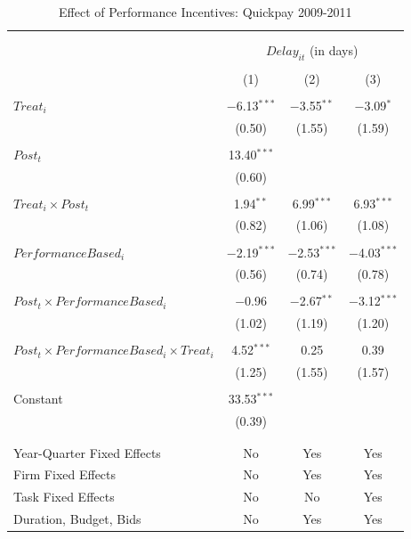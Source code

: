 \documentclass[
]{article}
\begin{document}
\begin{table}[H] \centering 
  \caption{Effect of Performance Incentives: Quickpay 2009-2011} 
  \label{} 
\small 
\begin{tabular}{@{\extracolsep{-2pt}}lccc} 
\\[-1.8ex]\hline 
\hline \\[-1.8ex] 
\\[-1.8ex] & \multicolumn{3}{c}{$Delay_{it}$ (in days)} \\ 
\\[-1.8ex] & (1) & (2) & (3)\\ 
\hline \\[-1.8ex] 
 $Treat_i$ & $-$6.13$^{***}$ & $-$3.55$^{**}$ & $-$3.09$^{*}$ \\ 
  & (0.50) & (1.55) & (1.59) \\ 
  & & & \\ 
 $Post_t$ & 13.40$^{***}$ &  &  \\ 
  & (0.60) &  &  \\ 
  & & & \\ 
 $Treat_i \times Post_t$ & 1.94$^{**}$ & 6.99$^{***}$ & 6.93$^{***}$ \\ 
  & (0.82) & (1.06) & (1.08) \\ 
  & & & \\ 
 $PerformanceBased_i$ & $-$2.19$^{***}$ & $-$2.53$^{***}$ & $-$4.03$^{***}$ \\ 
  & (0.56) & (0.74) & (0.78) \\ 
  & & & \\ 
 $Post_t \times PerformanceBased_i$ & $-$0.96 & $-$2.67$^{**}$ & $-$3.12$^{***}$ \\ 
  & (1.02) & (1.19) & (1.20) \\ 
  & & & \\ 
 $Post_t \times PerformanceBased_i \times Treat_i$ & 4.52$^{***}$ & 0.25 & 0.39 \\ 
  & (1.25) & (1.55) & (1.57) \\ 
  & & & \\ 
 Constant & 33.53$^{***}$ &  &  \\ 
  & (0.39) &  &  \\ 
  & & & \\ 
\hline \\[-1.8ex] 
Year-Quarter Fixed Effects & No & Yes & Yes \\ 
Firm Fixed Effects & No & Yes & Yes \\ 
Task Fixed Effects & No & No & Yes \\ 
Duration, Budget, Bids & No & Yes & Yes \\ 

\end{tabular}
\end{table}
\end{document}
